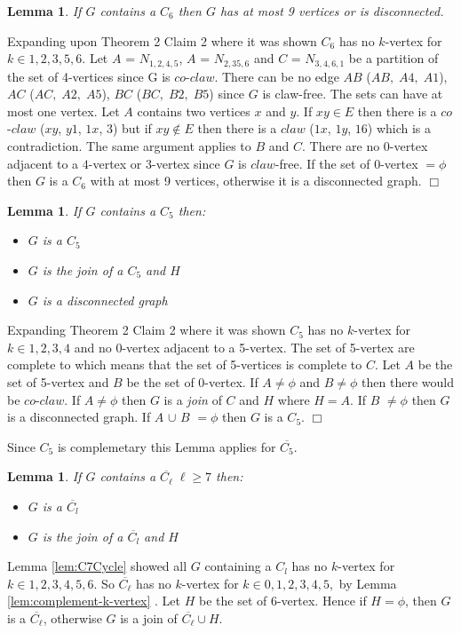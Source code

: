 \documentclass[12pt]{article}
\newtheorem{Lemma}[Theorem]{Lemma}
\begin{document}
\begin{Lemma}\label{lem:C69V}
If $G$ contains a $C_6$ then $G$ has at most 9 vertices or is disconnected.
\end{Lemma}
 Expanding \cite{BraFud2002} upon Theorem 2 Claim 2 where it was shown $C_6$ has no $k$-vertex for $k \in {1, 2, 3, 5, 6}$. Let $A$ = $N_{1,2,4,5}$, $A$ = $N_{2,35,6}$ and $C$ = $N_{3,4,6,1}$ be a partition of the set of 4-vertices since G is $co$-$claw$. There can be no edge $AB$ ($AB,\;A4,\;A1$), $AC$ ($AC,\;A2,\;A5$), $BC$ ($BC,\;B2,\;B5$) since $G$ is claw-free. The sets can have at most one vertex. Let $A$ contains two vertices $x$ and $y$. If $xy \in E$ then there is a $co$-$claw$ ($xy$, $y1$, $1x$, $3$) but if $xy \not\in E$ then there is a $claw$ ($1x$, $1y$, $16$) which is a contradiction. The same argument applies to $B$ and $C$. There are no $0$-vertex adjacent to a $4$-vertex or $3$-vertex since $G$ is $claw$-free. If the set of $0$-vertex $= \phi$ then $G$ is a $C_6$ with at most 9 vertices, otherwise it is a disconnected graph.  $\Box$



\medskip

\begin{Lemma}\label{lem:c5join}
If $G$ contains a $C_5$ then:
\begin{itemize}
\item[(i)]
$G$ is a $C_5$
\item[(i)]
$G$ is the join of a $C_5$ and $H$
\item[(i)]
$G$ is a disconnected graph
\end{itemize}
\end{Lemma}
 Expanding \cite{BraFud2002} Theorem 2 Claim 2 where it was shown $C_5$ has no $k$-vertex for $k \in {1,2,3,4}$ and no 0-vertex adjacent to a 5-vertex. The set of 5-vertex are complete to
 which means that the set of 5-vertices is complete to $C$. Let $A$ be the set of 5-vertex and $B$ be the set of 0-vertex. If $A \neq \phi$ and $B \neq \phi$ then there would be $co$-$claw$. If $A \neq \phi$ then $G$ is a {\it join} of $C$ and $H$ where $H = A$. If $B$ $\neq \phi$ then  $G$ is a disconnected graph. If $A$ $\cup$ $B$ $= \phi$ then $G$ is a $C_5$.  $\Box$

Since $C_5$ is complemetary this Lemma applies for $\overline{C_5}$.
\medskip

\begin{Lemma}\label{lem:co-cl}
If $G$ contains a $\overline{C_\ell}\; \ell \geq 7$ then:
\begin{itemize}
\item[(i)]
$G$ is a $\overline{C_l}$
\item[(i)]
$G$ is the join of a $\overline{C_l}$ and $H$
\end{itemize}
\end{Lemma}
 Lemma \ref{lem:C7Cycle} showed all $G$ containing a $C_l$ has no $k$-vertex for $k \in {1, 2, 3, 4, 5, 6}$. So $\overline{C_\ell}$ has no $k$-vertex for $k \in {0, 1, 2, 3, 4, 5,}$ by Lemma \ref{lem:complement-k-vertex} . Let $H$ be the set of 6-vertex. Hence if $H = \phi$, then $G$ is a $\overline{C_\ell}$, otherwise $G$ is a join of $\overline{C_\ell} \cup H$.
\end{document}
